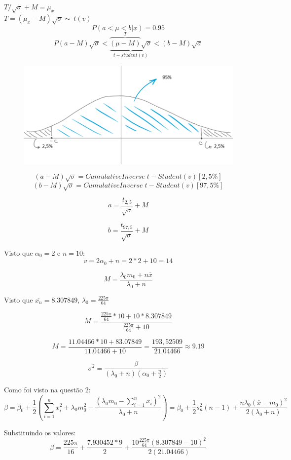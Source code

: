 \documentclass{article}
\begin{document}
		$T/\sqrt{\sigma} + M = \mu_{\overline{x}}$\\
		
		$T = (\mu_{\overline{x}} - M)\sqrt{\sigma} \sim\ t(v)$\\
		
		$$P(a < \mu < b | \underline{x}) = 0.95$$	
		$$P(a - M) \sqrt{\sigma} < \underbrace{\overbrace{(\mu - M)}^{T} \sqrt{\sigma}}_{t-student(v)} < (b - M) \sqrt{\sigma}$$
		
		
		\begin{figure}[H]
			\centering
			\includegraphics[width=0.6\linewidth]{grafico1}
		\end{figure}
	
	$$(a - M) \sqrt{\sigma} = CumulativeInverse \; t-Student(v) [2,5\%]$$
	$$(b - M) \sqrt{\sigma} = CumulativeInverse \; t-Student(v) [97,5\%]$$
	
	$$a = \frac{t_{2,5}}{\sqrt{\sigma}} + M$$
	
	$$b = \frac{t_{97,5}}{\sqrt{\sigma}} + M$$
	
	Visto que $\alpha_0 = 2$ e $n = 10$:
	$$v = 2\alpha_0 + n = 2 * 2 + 10 = 14$$
	
	$$M = \frac{\lambda_0 m_0 + n \overline{x}}{\lambda_0 + n}$$
	
	Visto que $\overline{x_n} = 8.307849$, $\lambda_0 = \frac{225\pi}{64}$
	
	$$M = \frac{\frac{225\pi}{64} * 10 + 10 * 8.307849}{\frac{225\pi}{64} + 10}$$
	
	$$M = \frac{11.04466 * 10 + 83.07849}{11.04466 + 10} = \frac{193,52509}{21.04466} \approx 9.19$$
	
	
	
	$$\sigma^2 = \frac{\beta}{(\lambda_0 + n)(\alpha_0 + \frac{n}{2})}$$
	
	Como foi visto na questão 2:
	$$\beta = \beta_0 + \frac{1}{2} (\sum_{i=1}^{n}x_i^2 + \lambda_0 m_0^2 - \frac{(\lambda_0 m_0 - \sum_{i=1}^{n}x_i)^2}{\lambda_0 + n}) = \beta_0 + \frac{1}{2} s_n^2 (n-1) + \frac{n \lambda_0(\overline{x} - m_0)^2}{2(\lambda_0 + n)}$$
	
	Substituindo os valores:	
	$$\beta = \frac{225\pi}{16} + \frac{7.930452 * 9}{2} + \frac{10 \frac{225\pi}{64}(8.307849 - 10)^2}{2(21.04466)}$$
	
\end{document}
